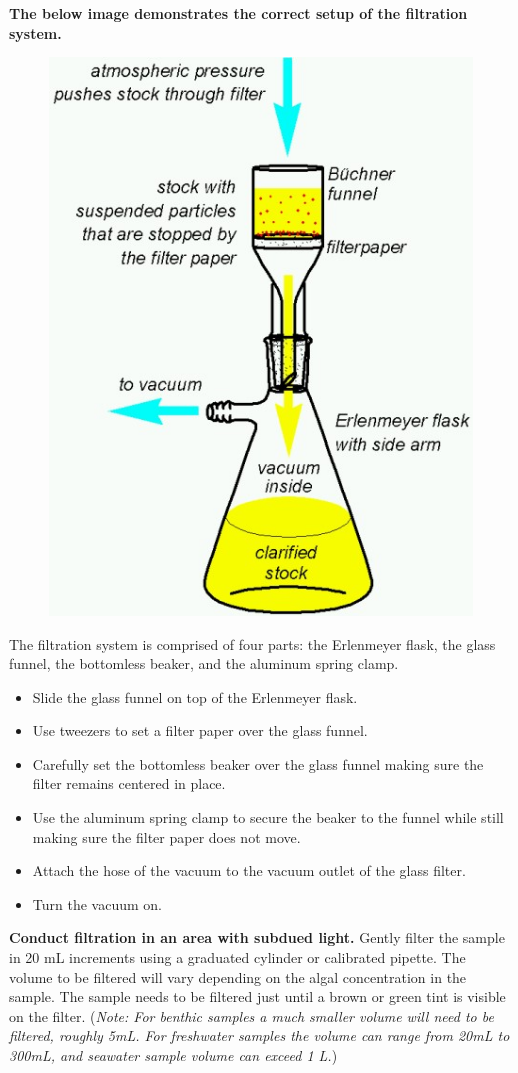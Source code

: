 \documentclass[12pt]{../SOP3}\usepackage[]{graphicx}\usepackage[]{color}
\begin{document}
\NP\textbf{The below image demonstrates the correct setup of the filtration system.}

\begin{figure}[h!]
\includegraphics[width=.5\linewidth]{Filtersetup.jpg}
\end{figure}

The filtration system is comprised of four parts: the Erlenmeyer flask, the glass funnel, the bottomless beaker, and the aluminum spring clamp. 
\begin{itemize}
\item Slide the glass funnel on top of the Erlenmeyer flask.
\item Use tweezers to set a filter paper over the glass funnel.
\item Carefully set the bottomless beaker over the glass funnel making sure the filter remains centered in place. 
\item Use the aluminum spring clamp to secure the beaker to the funnel while still making sure the filter paper does not move. \item Attach the hose of the vacuum to the vacuum outlet of the glass filter.
\item Turn the vacuum on. 
\end{itemize}






\NP \textbf{Conduct filtration in an area with subdued light.} Gently filter the sample in 20 mL increments using a graduated cylinder or calibrated pipette. The volume to be filtered will vary depending on the algal concentration in the sample. The sample needs to be filtered just until a brown or green tint is visible on the filter. ({\small \textit{Note: For benthic samples a much smaller volume will need to be filtered, roughly 5mL. For freshwater samples the volume can range from 20mL to 300mL, and seawater sample volume can exceed 1 L.}})
\end{document}
